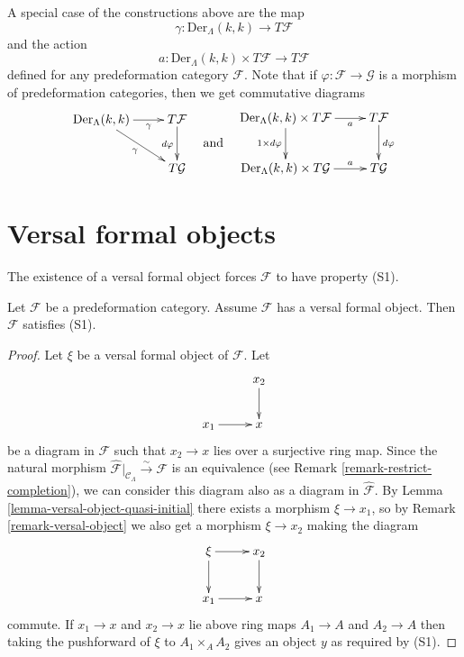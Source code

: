 \noindent
A special case of the constructions above are the map
\begin{equation}
\label{equation-map}
\gamma : \text{Der}_\Lambda(k, k) \longrightarrow T\mathcal{F}
\end{equation}
and the action
\begin{equation}
\label{equation-action}
a : \text{Der}_\Lambda(k, k) \times T\mathcal{F} \longrightarrow T\mathcal{F}
\end{equation}
defined for any predeformation category $\mathcal{F}$.
Note that if $\varphi : \mathcal{F} \to \mathcal{G}$ is a morphism
of predeformation categories, then we get commutative diagrams
$$
\vcenter{
\xymatrix{
\text{Der}_\Lambda(k, k) \ar[r]_-\gamma \ar[rd]_\gamma &
T\mathcal{F} \ar[d]_{d\varphi} \\
& T\mathcal{G}
}
}
\quad\text{and}\quad
\vcenter{
\xymatrix{
\text{Der}_\Lambda(k, k) \times T\mathcal{F} \ar[r]_-a
\ar[d]_{1 \times d\varphi} &
T\mathcal{F} \ar[d]^{d\varphi} \\
\text{Der}_\Lambda(k, k) \times T\mathcal{G} \ar[r]^-a &
T\mathcal{G}
}
}
$$










\section{Versal formal objects}
\label{section-versal-objects}

\noindent
The existence of a versal formal object forces $\mathcal{F}$ to have
property (S1).

\begin{lemma}
\label{lemma-versal-object-S1}
Let $\mathcal{F}$ be a predeformation category.
Assume $\mathcal{F}$ has a versal formal object.
Then $\mathcal{F}$ satisfies (S1).
\end{lemma}

\begin{proof}
Let $\xi$ be a versal formal object of $\mathcal{F}$. Let
$$
\xymatrix{
           & x_2 \ar[d] \\
x_1 \ar[r] & x
}
$$
be a diagram in $\mathcal{F}$ such that $x_2 \to x$ lies over a
surjective ring map. Since the natural morphism
$\widehat{\mathcal{F}}|_{\mathcal{C}_\Lambda} \xrightarrow{\sim} \mathcal{F}$
is an equivalence (see
Remark \ref{remark-restrict-completion}), we can consider this
diagram also as a diagram in $\widehat{\mathcal{F}}$. By
Lemma \ref{lemma-versal-object-quasi-initial} there exists a morphism
$\xi \to x_1$, so by
Remark \ref{remark-versal-object} we also get a
morphism $\xi \to x_2$ making the diagram
$$
\xymatrix{
\xi \ar[r] \ar[d]          & x_2 \ar[d] \\
x_1 \ar[r] & x
}
$$
commute. If $x_1 \to x$ and $x_2 \to x$ lie above ring maps
$A_1 \to A$ and $A_2 \to A$ then taking the pushforward of
$\xi$ to $A_1 \times_A A_2$ gives an object $y$ as required by (S1).
\end{proof}

